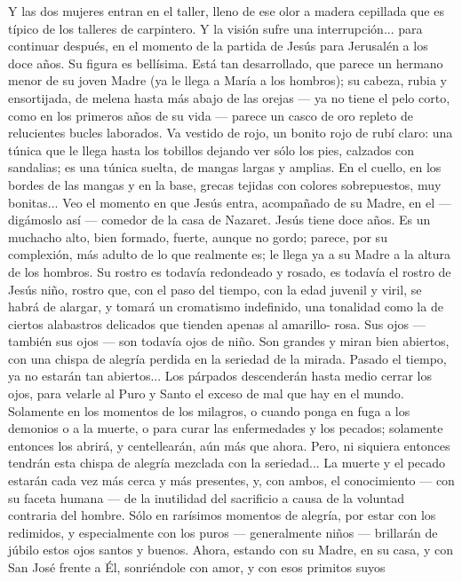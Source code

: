 \documentclass[12pt]{book} %
\begin{document}
Y las dos mujeres entran en el taller, lleno de ese olor a madera cepillada que es típico de los talleres de carpintero. 
Y la visión sufre una interrupción... para continuar después, en el momento de la partida de Jesús para Jerusalén a los doce años. 
Su figura es bellísima. Está tan desarrollado, que parece un hermano menor de su joven Madre (ya le llega a María a los hombros); su cabeza, rubia y ensortijada, de melena hasta más abajo de las orejas — ya no tiene el pelo corto, como en los primeros años de su vida — parece un casco de oro repleto de relucientes bucles laborados. 
Va vestido de rojo, un bonito rojo de rubí claro: una túnica que le llega hasta los tobillos dejando ver sólo los pies, 
calzados con sandalias; es una túnica suelta, de mangas largas y amplias. En el cuello, en los bordes de las mangas y en la base, grecas tejidas con colores sobrepuestos, muy bonitas... 
Veo el momento en que Jesús entra, acompañado de su Madre, en el — digámoslo así — comedor de la casa de Nazaret. 
Jesús tiene doce años. Es un muchacho alto, bien formado, fuerte, aunque no gordo; parece, por su complexión, más 
adulto de lo que realmente es; le llega ya a su Madre a la altura de los hombros. Su rostro es todavía redondeado y rosado, es todavía el rostro de Jesús niño, rostro que, con el paso del tiempo, con la edad juvenil y viril, se habrá de alargar, y tomará un cromatismo indefinido, una tonalidad como la de ciertos alabastros delicados que tienden apenas al amarillo- rosa. 
Sus ojos — también sus ojos — son todavía ojos de niño. Son grandes y miran bien abiertos, con una chispa de alegría perdida en la seriedad de la mirada. Pasado el tiempo, ya no estarán tan abiertos... Los párpados descenderán hasta medio cerrar los ojos, para velarle al Puro y Santo el exceso de mal que hay en el mundo. Solamente en los momentos de los milagros, o cuando ponga en fuga a los demonios o a la muerte, o para curar las enfermedades y los pecados; solamente entonces los abrirá, y centellearán, aún más que ahora. Pero, ni siquiera entonces tendrán esta chispa de alegría mezclada con la seriedad... La muerte y el pecado estarán cada vez más cerca y más presentes, y, con ambos, el conocimiento — con su faceta humana — de la inutilidad del sacrificio a causa de la voluntad contraria del hombre. Sólo en rarísimos momentos de alegría, por estar con los redimidos, y especialmente con los puros — generalmente niños — brillarán de júbilo estos ojos santos y buenos. 
Ahora, estando con su Madre, en su casa, y con San José frente a Él, sonriéndole con amor, y con esos primitos suyos 
\end{document}

